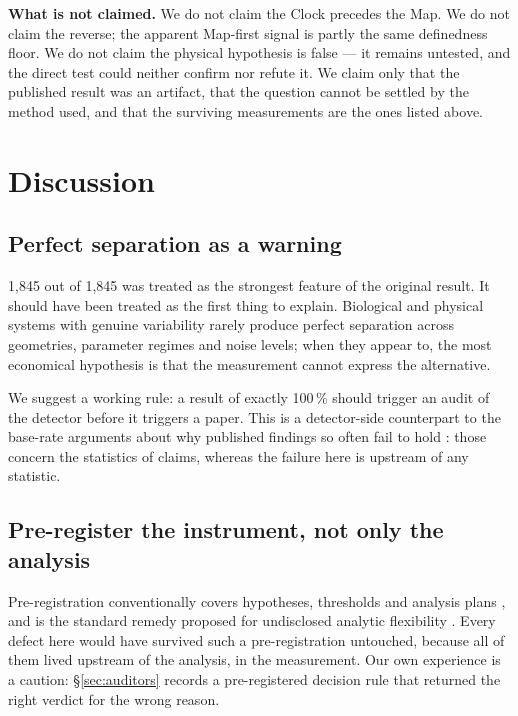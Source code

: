 \documentclass[11pt,letterpaper]{article}
\begin{document}
\noindent
\textbf{What is not claimed.} We do not claim the Clock precedes the
Map. We do not claim the reverse; the apparent Map-first signal is
partly the same definedness floor. We do not claim the physical
hypothesis is false --- it remains untested, and the direct test could
neither confirm nor refute it. We claim only that the published result
was an artifact, that the question cannot be settled by the method used,
and that the surviving measurements are the ones listed above.

\section{Discussion}

\subsection{Perfect separation as a warning}

1{,}845 out of 1{,}845 was treated as the strongest feature of the
original result. It should have been treated as the first thing to
explain. Biological and physical systems with genuine variability rarely
produce perfect separation across geometries, parameter regimes and
noise levels; when they appear to, the most economical hypothesis is
that the measurement cannot express the alternative.

We suggest a working rule: a result of exactly 100\,\% should trigger an
audit of the detector before it triggers a paper. This is a
detector-side counterpart to the base-rate arguments about why
published findings so often fail to hold
\citep{ioannidis2005,osc2015,baker2016}: those concern the statistics
of claims, whereas the failure here is upstream of any statistic.

\subsection{Pre-register the instrument, not only the analysis}

Pre-registration conventionally covers hypotheses, thresholds and
analysis plans \citep{nosek2018,munafo2017}, and is the standard remedy
proposed for undisclosed analytic flexibility
\citep{simmons2011,gelman2014}. Every defect here would have survived
such a pre-registration untouched, because all of them lived upstream of
the analysis, in the measurement. Our own experience is a caution:
\S\ref{sec:auditors} records a pre-registered decision rule that
returned the right verdict for the wrong reason.
\end{document}

